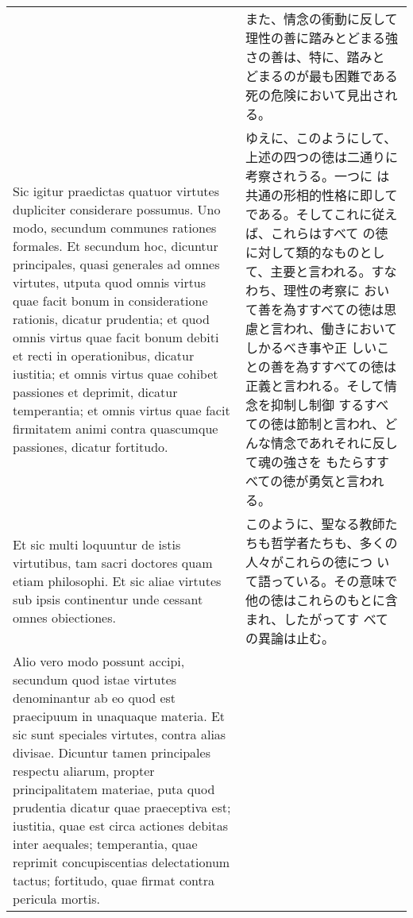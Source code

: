\documentclass[10pt]{jsarticle}
\begin{document}
\begin{longtable}{p{21em}p{21em}}
&

また、情念の衝動に反して理性の善に踏みとどまる強さの善は、特に、踏みと
どまるのが最も困難である死の危険において見出される。

 
\\

 Sic igitur praedictas quatuor virtutes dupliciter considerare
 possumus. Uno modo, secundum communes rationes formales. Et secundum
 hoc, dicuntur principales, quasi generales ad omnes virtutes, utputa
 quod omnis virtus quae facit bonum in consideratione rationis,
 dicatur prudentia; et quod omnis virtus quae facit bonum debiti et
 recti in operationibus, dicatur iustitia; et omnis virtus quae
 cohibet passiones et deprimit, dicatur temperantia; et omnis virtus
 quae facit firmitatem animi contra quascumque passiones, dicatur
 fortitudo.
 
&

 ゆえに、このようにして、上述の四つの徳は二通りに考察されうる。一つに
 は共通の形相的性格に即してである。そしてこれに従えば、これらはすべて
 の徳に対して類的なものとして、主要と言われる。すなわち、理性の考察に
 おいて善を為すすべての徳は思慮と言われ、働きにおいてしかるべき事や正
 しいことの善を為すすべての徳は正義と言われる。そして情念を抑制し制御
 するすべての徳は節制と言われ、どんな情念であれそれに反して魂の強さを
 もたらすすべての徳が勇気と言われる。

 
\\



 Et sic multi loquuntur de istis virtutibus, tam sacri doctores quam
 etiam philosophi. Et sic aliae virtutes sub ipsis continentur unde
 cessant omnes obiectiones.

 
&


 このように、聖なる教師たちも哲学者たちも、多くの人々がこれらの徳につ
 いて語っている。その意味で他の徳はこれらのもとに含まれ、したがってす
 べての異論は止む。
 
\\


 Alio vero modo possunt accipi, secundum quod istae virtutes
 denominantur ab eo quod est praecipuum in unaquaque materia. Et sic
 sunt speciales virtutes, contra alias divisae. Dicuntur tamen
 principales respectu aliarum, propter principalitatem materiae, puta
 quod prudentia dicatur quae praeceptiva est; iustitia, quae est circa
 actiones debitas inter aequales; temperantia, quae reprimit
 concupiscentias delectationum tactus; fortitudo, quae firmat contra
 pericula mortis.
 

\end{longtable}
\end{document}
